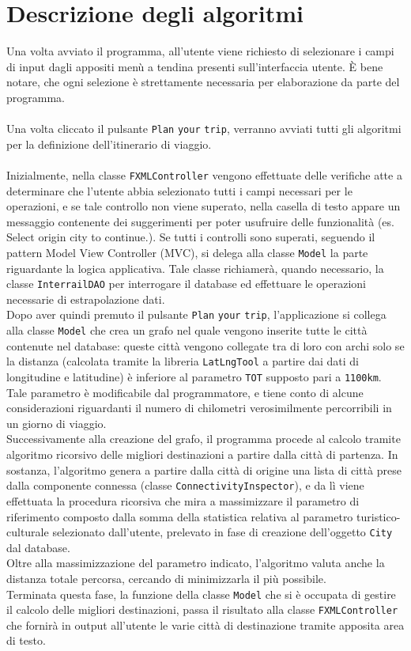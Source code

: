 \documentclass[12pt, a4paper]{article}
\begin{document}
	\section{Descrizione degli algoritmi}
	Una volta avviato il programma, all'utente viene richiesto di selezionare i campi di input dagli appositi menù a tendina presenti sull'interfaccia utente. È bene notare, che ogni selezione è strettamente necessaria per elaborazione da parte del programma.\\\\Una volta cliccato il pulsante \verb*|Plan| \verb*|your| \verb*|trip|, verranno avviati tutti gli algoritmi per la definizione dell'itinerario di viaggio.\\\\Inizialmente, nella classe \verb*|FXMLController| vengono effettuate delle verifiche atte a determinare che l'utente abbia selezionato tutti i campi necessari per le operazioni, e se tale controllo non viene superato, nella casella di testo appare un messaggio contenente dei suggerimenti per poter usufruire delle funzionalità (es. Select origin city to continue.). Se tutti i controlli sono superati, seguendo il pattern Model View Controller (MVC), si delega alla classe \verb*|Model| la parte riguardante la logica applicativa. Tale classe richiamerà, quando necessario, la classe \verb*|InterrailDAO| per interrogare il database ed effettuare le operazioni necessarie di estrapolazione dati.\\Dopo aver quindi premuto il pulsante \verb*|Plan| \verb*|your| \verb*|trip|, l'applicazione si collega alla classe \verb*|Model| che crea un grafo nel quale vengono inserite tutte le città contenute nel database: queste città vengono collegate tra di loro con archi solo se la distanza (calcolata tramite la libreria \verb*|LatLngTool| a partire dai dati di longitudine e latitudine) è inferiore al parametro \verb*|TOT| supposto pari a \verb*|1100km|. Tale parametro è modificabile dal programmatore, e tiene conto di alcune considerazioni riguardanti il numero di chilometri verosimilmente percorribili in un giorno di viaggio.\\Successivamente alla creazione del grafo, il programma procede al calcolo tramite algoritmo ricorsivo delle migliori destinazioni a partire dalla città di partenza. In sostanza, l'algoritmo genera a partire dalla città di origine una lista di città prese dalla componente connessa (classe \verb*|ConnectivityInspector|), e da lì viene effettuata la procedura ricorsiva che mira a massimizzare il parametro di riferimento composto dalla somma della statistica relativa al parametro turistico-culturale selezionato dall'utente, prelevato in fase di creazione dell'oggetto \verb*|City| dal database.\\Oltre alla massimizzazione del parametro indicato, l'algoritmo valuta anche la distanza totale percorsa, cercando di minimizzarla il più possibile.\\ Terminata questa fase, la funzione della classe \verb*|Model| che si è occupata di gestire il calcolo delle migliori destinazioni, passa il risultato alla classe \verb*|FXMLController| che fornirà in output all'utente le varie città di destinazione tramite apposita area di testo.
	
\end{document}
